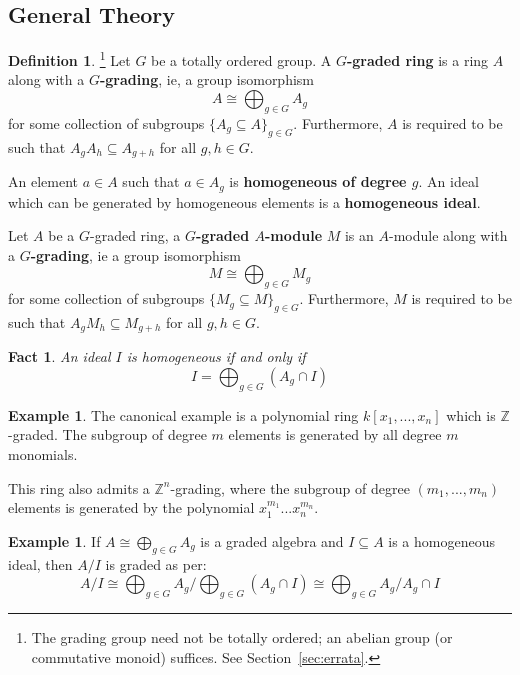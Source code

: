 \documentclass[12pt]{article}
\theoremstyle{plain}
\newtheorem{fact}[thm]{Fact}
\theoremstyle{definition}
\newtheorem{defn}[thm]{Definition} %
\newtheorem{example}[thm]{Example}
\newcommand{\bb}[1]{\mathbb{#1}}
\begin{document}
\subsection{General Theory}
\begin{defn}\footnote{The grading group need not be totally ordered; an abelian group (or commutative monoid) suffices. See Section~\ref{sec:errata}.}
Let $G$ be a totally ordered group. A \textbf{$G$-graded ring} is a ring $A$ along with a \textbf{$G$-grading}, ie, a group isomorphism
\begin{equation}
A \cong \bigoplus_{g \in G}A_g
\end{equation}
for some collection of subgroups $\lbrace A_g \subseteq A \rbrace_{g \in G}$. Furthermore, $A$ is required to be such that $A_gA_h \subseteq A_{g + h}$ for all $g,h \in G$.

An element $a \in A$ such that $a \in A_g$ is \textbf{homogeneous of degree $g$}. An ideal which can be generated by homogeneous elements is a \textbf{homogeneous ideal}.

Let $A$ be a $G$-graded ring, a \textbf{$G$-graded $A$-module} $M$ is an $A$-module along with a \textbf{$G$-grading}, ie a group isomorphism
\begin{equation}
M \cong \bigoplus_{g \in G} M_g
\end{equation}
for some collection of subgroups $\lbrace M_g \subseteq M\rbrace_{g \in G}$. Furthermore, $M$ is required to be such that $A_gM_h \subseteq M_{g + h}$ for all $g,h \in G$.
\end{defn}
\begin{fact}
An ideal $I$ is homogeneous if and only if
\begin{equation}
I = \bigoplus_{g \in G}(A_g \cap I)
\end{equation}
\end{fact}
\begin{example}
The canonical example is a polynomial ring $k[x_1,...,x_n]$ which is $\bb{Z}$-graded. The subgroup of degree $m$ elements is generated by all degree $m$ monomials.

This ring also admits a $\bb{Z}^n$-grading, where the subgroup of degree $(m_1,...,m_n)$ elements is generated by the polynomial $x^{m_1}_1...x^{m_n}_n$.
\end{example}
\begin{example}\label{ex:quotient_of_homog_by_homog}
If $A \cong \bigoplus_{g \in G}A_g$ is a graded algebra and $I \subseteq A$ is a homogeneous ideal, then $A/I$ is graded as per:
\begin{equation}
A/I \cong \bigoplus_{g \in G}A_g/\bigoplus_{g \in G}(A_g \cap I) \cong \bigoplus_{g \in G}A_g/A_g \cap I
\end{equation}
\end{example}
\end{document}
